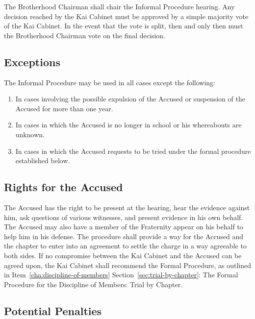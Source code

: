 The Brotherhood Chairman shall chair the Informal Procedure hearing.
Any decision reached by the Kai Cabinet must be approved by a simple majority
vote of the Kai Cabinet.
In the event that the vote is split, then and only then must the Brotherhood
Chairman vote on the final decision.

\subsection{Exceptions}
\label{sec:exceptions}
The Informal Procedure may be used in all cases except the following:
\begin{enumerate}
    \item In cases involving the possible expulsion of the Accused or
        suspension of the Accused for more than one year.
    \item In cases in which the Accused is no longer in school or his
        whereabouts are unknown.
    \item In cases in which the Accused requests to be tried under the formal
        procedure established below.
\end{enumerate}

\subsection{Rights for the Accused}

The Accused has the right to be present at the hearing, hear the evidence
against him, ask questions of various witnesses, and present evidence in his
own behalf.
The Accused may also have a member of the Fraternity appear on his behalf to
help him in his defense.
The procedure shall provide a way for the Accused and the chapter to enter into
an agreement to settle the charge in a way agreeable to both sides.
If no compromise between the Kai Cabinet and the Accused can be agreed upon,
the Kai Cabinet shall recommend the Formal Procedure, as outlined in
Item~\ref{cha:discipline-of-members} Section~\ref{sec:trial-by-chapter}: The
Formal Procedure for the Discipline of Members: Trial by Chapter.

\subsection{Potential Penalties}

